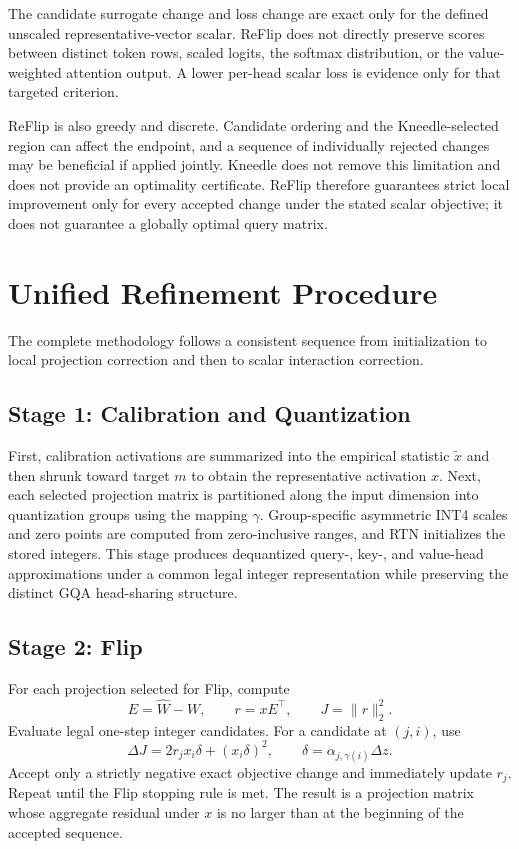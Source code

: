 The candidate surrogate change and loss change are exact only for the defined unscaled representative-vector scalar. ReFlip does not directly preserve scores between distinct token rows, scaled logits, the softmax distribution, or the value-weighted attention output. A lower per-head scalar loss is evidence only for that targeted criterion.

ReFlip is also greedy and discrete. Candidate ordering and the Kneedle-selected region can affect the endpoint, and a sequence of individually rejected changes may be beneficial if applied jointly. Kneedle does not remove this limitation and does not provide an optimality certificate. ReFlip therefore guarantees strict local improvement only for every accepted change under the stated scalar objective; it does not guarantee a globally optimal query matrix.

\section{Unified Refinement Procedure}

The complete methodology follows a consistent sequence from initialization to local projection correction and then to scalar interaction correction.

\subsection{Stage 1: Calibration and Quantization}

First, calibration activations are summarized into the empirical statistic $\tilde{x}$ and then shrunk toward target $m$ to obtain the representative activation $x$. Next, each selected projection matrix is partitioned along the input dimension into quantization groups using the mapping $\gamma$. Group-specific asymmetric INT4 scales and zero points are computed from zero-inclusive ranges, and RTN initializes the stored integers. This stage produces dequantized query-, key-, and value-head approximations under a common legal integer representation while preserving the distinct GQA head-sharing structure.

\subsection{Stage 2: Flip}

For each projection selected for Flip, compute
\begin{equation}
E=\hat W-W,\qquad r=xE^\top,\qquad J=\|r\|_2^2.
\end{equation}
Evaluate legal one-step integer candidates. For a candidate at $(j,i)$, use
\begin{equation}
\Delta J=2r_jx_i\delta+(x_i\delta)^2,
\qquad
\delta=\alpha_{j,\gamma(i)}\Delta z.
\end{equation}
Accept only a strictly negative exact objective change and immediately update $r_j$. Repeat until the Flip stopping rule is met. The result is a projection matrix whose aggregate residual under $x$ is no larger than at the beginning of the accepted sequence.

